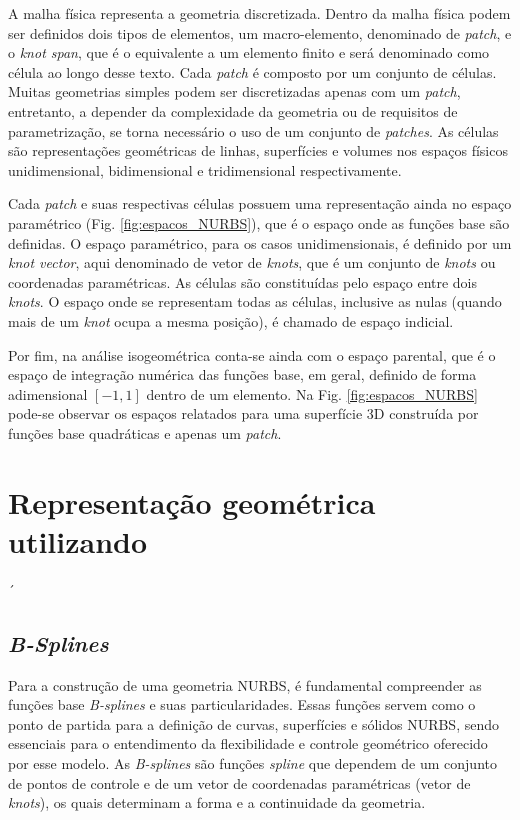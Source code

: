 \documentclass[tese_patricia]{subfiles}
\begin{document}
A malha física representa a geometria discretizada. Dentro da malha física podem ser definidos dois tipos de elementos, um macro-elemento, denominado de \textit{patch}, e o \textit{knot span}, que é o equivalente a um elemento finito e será denominado como célula ao longo desse texto. Cada \textit{patch} é composto por um conjunto de células. Muitas geometrias simples podem ser discretizadas apenas com um \textit{patch}, entretanto, a depender da complexidade da geometria ou de requisitos de parametrização, se torna necessário o uso de um conjunto de \textit{patches}. As células são representações geométricas de linhas, superfícies e volumes nos espaços físicos unidimensional, bidimensional e tridimensional respectivamente.

Cada \textit{patch} e suas respectivas células possuem uma representação ainda no espaço paramétrico (Fig. \ref{fig:espacos_NURBS}), que é o espaço onde as funções base são definidas. O espaço paramétrico, para os casos unidimensionais, é definido por um \textit{knot vector}, aqui denominado de vetor de \textit{knots}, que é um conjunto de \textit{knots} ou coordenadas paramétricas. As células são constituídas pelo espaço entre dois \textit{knots}. O espaço onde se representam todas as células, inclusive as nulas (quando mais de um \textit{knot} ocupa a mesma posição), é chamado de espaço indicial.

Por fim, na análise isogeométrica conta-se ainda com o espaço parental, que é o espaço de integração numérica das funções base, em geral, definido de forma adimensional $[-1, 1]$ dentro de um elemento. Na Fig. \ref{fig:espacos_NURBS} pode-se observar os espaços relatados para uma superfície 3D construída por funções base quadráticas e apenas um \textit{patch}. 

\section{Representação geométrica utilizando } \label{capitulo:Cap3:RepreGeo}´

\subsection{\textit{B-Splines}}

Para a construção de uma geometria NURBS, é fundamental compreender as funções base \textit{B-splines} e suas particularidades. Essas funções servem como o ponto de partida para a definição de curvas, superfícies e sólidos NURBS, sendo essenciais para o entendimento da flexibilidade e controle geométrico oferecido por esse modelo. As \textit{B-splines} são funções \textit{spline} que dependem de um conjunto de pontos de controle e de um vetor de coordenadas paramétricas (vetor de \textit{knots}), os quais determinam a forma e a continuidade da geometria.
\end{document}
